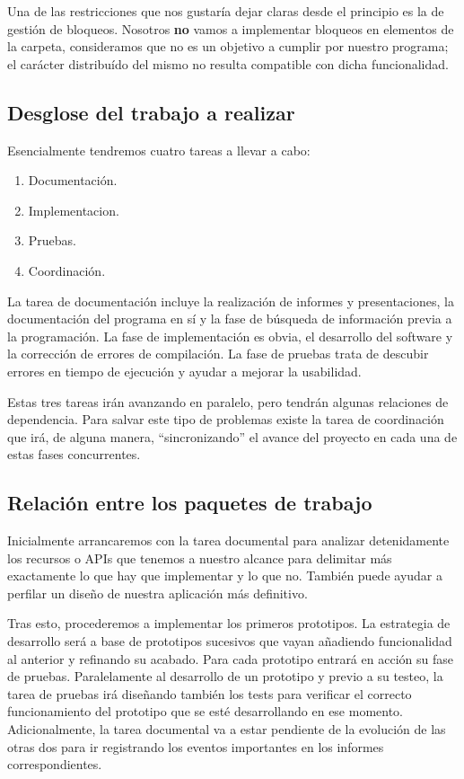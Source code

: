 \documentclass[a4paper,12pt,titlepage]{article}
\begin{document}
Una de las restricciones que nos gustaría dejar claras desde el principio es
la de gestión de bloqueos. Nosotros \textbf{no} vamos a implementar bloqueos en
elementos de la carpeta, consideramos que no es un objetivo a cumplir por
nuestro programa; el carácter distribuído del mismo no resulta compatible con
dicha funcionalidad.

\subsection{Desglose del trabajo a realizar}

Esencialmente tendremos cuatro tareas a llevar a cabo:

\begin{enumerate}
\item Documentación.
\item Implementacion.
\item Pruebas.
\item Coordinación.
\end{enumerate}

La tarea de documentación incluye la realización de informes y presentaciones,
la documentación del programa en sí y la fase de búsqueda de información
previa a la programación. La fase de implementación es obvia, el desarrollo
del software y la corrección de errores de compilación. La fase de pruebas
trata de descubir errores en tiempo de ejecución y ayudar a mejorar la
usabilidad.

Estas tres tareas irán avanzando en paralelo, pero tendrán algunas
relaciones de dependencia. Para salvar este tipo de problemas existe la tarea
de coordinación que irá, de alguna manera, ``sincronizando'' el avance del
proyecto en cada una de estas fases concurrentes.

\subsection{Relación entre los paquetes de trabajo}

Inicialmente arrancaremos con la tarea documental para analizar detenidamente
los recursos o APIs que tenemos a nuestro alcance para delimitar más
exactamente  lo que hay que implementar y lo que no. También puede ayudar a
perfilar un diseño de nuestra aplicación más definitivo.

Tras esto, procederemos a implementar los primeros prototipos. La estrategia de
desarrollo será a base de prototipos sucesivos que vayan añadiendo
funcionalidad al anterior y refinando su acabado. Para cada prototipo entrará
en acción su fase de pruebas. Paralelamente al desarrollo
de un prototipo y previo a su testeo, la tarea de pruebas irá diseñando también
los tests para verificar el correcto funcionamiento del prototipo que se esté
desarrollando en ese momento. Adicionalmente, la tarea documental va a estar
pendiente de la evolución de las otras dos para ir registrando los eventos
importantes en los informes correspondientes.
\end{document}
